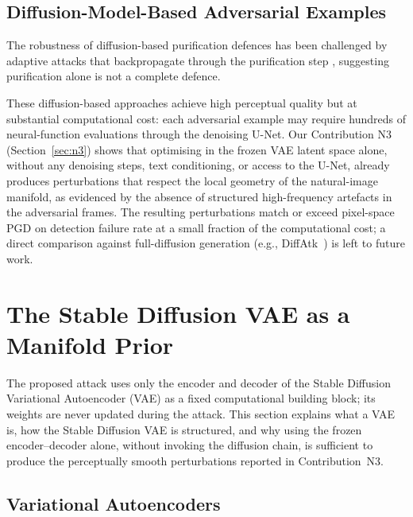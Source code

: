 \documentclass[12pt,a4paper]{report}
\begin{document}
\subsection{Diffusion-Model-Based Adversarial Examples}

The robustness of diffusion-based purification defences
\cite{nie2022diffusion} has been challenged by adaptive attacks
that backpropagate through the purification step
\cite{athalye2018obfuscated}, suggesting purification alone is not a
complete defence.

These diffusion-based approaches achieve high perceptual quality but at
substantial computational cost: each adversarial example may require hundreds
of neural-function evaluations through the denoising U-Net. Our Contribution
N3 (Section~\ref{sec:n3}) shows that optimising in the frozen VAE latent
space alone, without any denoising steps, text conditioning, or access to
the U-Net, already produces perturbations that respect the local geometry
of the natural-image manifold, as evidenced by the absence of structured
high-frequency artefacts in the adversarial frames. The resulting
perturbations match or exceed pixel-space PGD on detection failure rate
at a small fraction of the computational cost; a direct comparison against
full-diffusion generation (e.g., DiffAtk~\cite{xue2023diffusion}) is left
to future work.

\section{The Stable Diffusion VAE as a Manifold Prior}
\label{sec:vae_prior}

The proposed attack uses only the encoder and decoder of the Stable
Diffusion Variational Autoencoder (VAE) as a fixed computational building
block; its weights are never updated during the attack. This section
explains what a VAE is, how the Stable Diffusion VAE is structured, and
why using the frozen encoder--decoder alone, without invoking the diffusion
chain, is sufficient to produce the perceptually smooth perturbations
reported in Contribution~N3.

\subsection{Variational Autoencoders}
\end{document}
